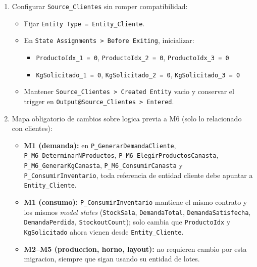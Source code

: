 \documentclass[11pt]{article}
\newcommand{\simio}[1]{\texttt{#1}}
\newcommand{\state}[1]{\texttt{#1}}
\newcommand{\proc}[1]{\texttt{#1}}
\begin{document}
\begin{enumerate}
\begin{itemize}
    \item \state{p} (Real, Vector, Rows = 10; probabilidades por producto para la hora activa)
    \item \state{cp} (Real, Vector, Rows = 10; probabilidades acumuladas para los bloques \simio{Decide\_Cand1..Decide\_Cand9})
    \item \state{ProductoIdx} (Integer) para consumo item a item
    \item \state{KgSolicitado} (Real) para consumo item a item
  \end{itemize}
  \item Configurar \simio{Source\_Clientes} sin romper compatibilidad:
  \begin{itemize}
    \item Fijar \simio{Entity Type = Entity\_Cliente}.
    \item En \simio{State Assignments > Before Exiting}, inicializar:
    \begin{itemize}
      \item \state{ProductoIdx\_1 = 0}, \state{ProductoIdx\_2 = 0}, \state{ProductoIdx\_3 = 0}
      \item \state{KgSolicitado\_1 = 0}, \state{KgSolicitado\_2 = 0}, \state{KgSolicitado\_3 = 0}
    \end{itemize}
    \item Mantener \simio{Source\_Clientes > Created Entity} vacio y conservar el trigger en \simio{Output@Source\_Clientes > Entered}.
  \end{itemize}
  \item Mapa obligatorio de cambios sobre logica previa a M6 (solo lo relacionado con clientes):
  \begin{itemize}
    \item \textbf{M1 (demanda):} en \proc{P\_GenerarDemandaCliente}, \proc{P\_M6\_DeterminarNProductos}, \proc{P\_M6\_ElegirProductosCanasta}, \proc{P\_M6\_GenerarKgCanasta}, \proc{P\_M6\_ConsumirCanasta} y \proc{P\_ConsumirInventario}, toda referencia de entidad cliente debe apuntar a \simio{Entity\_Cliente}.
    \item \textbf{M1 (consumo):} \proc{P\_ConsumirInventario} mantiene el mismo contrato y los mismos \textit{model states} (\state{StockSala}, \state{DemandaTotal}, \state{DemandaSatisfecha}, \state{DemandaPerdida}, \state{StockoutCount}); solo cambia que \state{ProductoIdx} y \state{KgSolicitado} ahora vienen desde \simio{Entity\_Cliente}.
    \item \textbf{M2--M5 (produccion, horno, layout):} no requieren cambio por esta migracion, siempre que sigan usando su entidad de lotes.

\end{itemize}
\end{enumerate}
\end{document}
